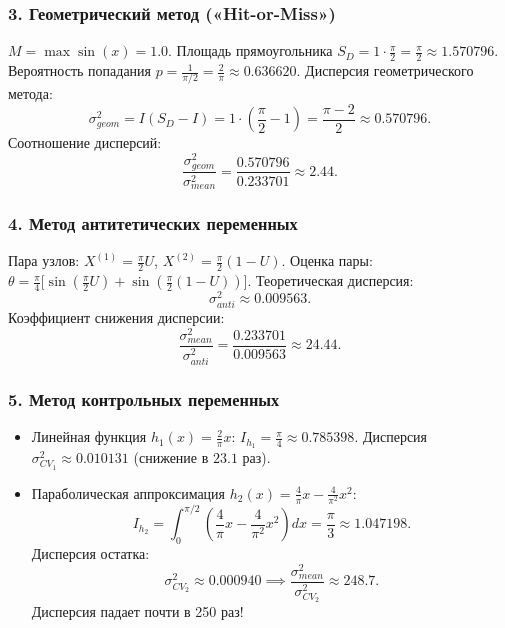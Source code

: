 \documentclass[11pt,a4paper]{article}
\begin{document}
\subsubsection{3. Геометрический метод («Hit-or-Miss»)}
$M = \max \sin(x) = 1.0$. Площадь прямоугольника $S_D = 1 \cdot \frac{\pi}{2} = \frac{\pi}{2} \approx 1.570796$.
Вероятность попадания $p = \frac{1}{\pi/2} = \frac{2}{\pi} \approx 0.636620$.
Дисперсия геометрического метода:
\begin{equation}
    \sigma^2_{geom} = I(S_D - I) = 1 \cdot \left(\frac{\pi}{2} - 1\right) = \frac{\pi - 2}{2} \approx 0.570796.
\end{equation}
Соотношение дисперсий:
\begin{equation}
    \frac{\sigma^2_{geom}}{\sigma^2_{mean}} = \frac{0.570796}{0.233701} \approx 2.44.
\end{equation}

\subsubsection{4. Метод антитетических переменных}
Пара узлов: $X^{(1)} = \frac{\pi}{2}U$, $X^{(2)} = \frac{\pi}{2}(1 - U)$.
Оценка пары: $\theta = \frac{\pi}{4}\big[\sin(\frac{\pi}{2}U) + \sin(\frac{\pi}{2}(1 - U))\big]$.
Теоретическая дисперсия:
\begin{equation}
    \sigma^2_{anti} \approx 0.009563.
\end{equation}
Коэффициент снижения дисперсии:
\begin{equation}
    \frac{\sigma^2_{mean}}{\sigma^2_{anti}} = \frac{0.233701}{0.009563} \approx 24.44.
\end{equation}

\subsubsection{5. Метод контрольных переменных}
\begin{itemize}
    \item Линейная функция $h_1(x) = \frac{2}{\pi}x$: $I_{h_1} = \frac{\pi}{4} \approx 0.785398$. Дисперсия $\sigma^2_{CV_1} \approx 0.010131$ (снижение в $23.1$ раз).
    \item Параболическая аппроксимация $h_2(x) = \frac{4}{\pi}x - \frac{4}{\pi^2}x^2$:
    $$I_{h_2} = \int_0^{\pi/2} \left(\frac{4}{\pi}x - \frac{4}{\pi^2}x^2\right) dx = \frac{\pi}{3} \approx 1.047198.$$
    Дисперсия остатка:
    \begin{equation}
        \sigma^2_{CV_2} \approx 0.000940 \implies \frac{\sigma^2_{mean}}{\sigma^2_{CV_2}} \approx 248.7.
    \end{equation}
    Дисперсия падает почти в 250 раз!
\end{itemize}
\end{document}
